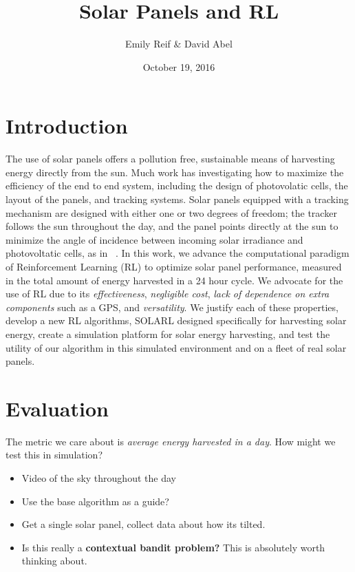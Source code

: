 \documentclass[11pt]{article}
\title{Solar Panels and RL}
\author{Emily Reif \& David Abel}
\date{October 19, 2016}
\begin{document}
\maketitle
\thispagestyle{dave}

\section{Introduction}
The use of solar panels offers a pollution free, sustainable means of harvesting energy directly from the sun. Much work has investigating how to maximize the efficiency of the end to end system, including the design of photovolatic cells, the layout of the panels, and tracking systems. Solar panels equipped with a tracking mechanism are designed with either one or two degrees of freedom; the tracker follows the sun throughout the day, and the panel points directly at the sun to minimize the angle of incidence between incoming solar irradiance and photovoltatic cells, as in ~\citet{Eke2012,Benghanem2011,King2001}. In this work, we advance the computational paradigm of Reinforcement Learning (RL) to optimize solar panel performance, measured in the total amount of energy harvested in a 24 hour cycle. We advocate for the use of RL due to its {\it effectiveness}, {\it negligible cost}, {\it lack of dependence on extra components} such as a GPS, and {\it versatility}. We justify each of these properties, develop a new RL algorithms, \textsc{SOLARL} designed specifically for harvesting solar energy, create a simulation platform for solar energy harvesting, and test the utility of our algorithm in this simulated environment and on a fleet of real solar panels.



\section{Evaluation}

The metric we care about is {\it average energy harvested in a day}. How might we test this in simulation?
\begin{itemize}
\item Video of the sky throughout the day
\item Use the base algorithm as a guide?
\item Get a single solar panel, collect data about how its tilted.
\item Is this really a {\bf contextual bandit problem?} This is absolutely worth thinking about.
\end{itemize}
\end{document}
